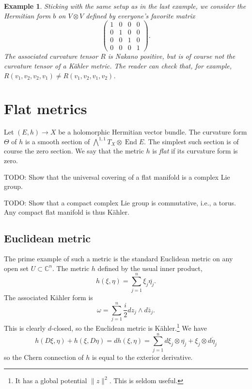 \documentclass[11pt]{article}
\newtheorem{exam}[theo]{Example}
\newcommand{\kk}[1]{\mathbb{#1}}
\DeclareMathOperator{\End}{End}
\begin{document}
\begin{exam}
  Sticking with the same setup as in the last example, we consider the Hermitian form $b$ on $V \otimes V$ defined by everyone's favorite matrix
$$
\begin{pmatrix}
  1 & 0 & 0 & 0 \\
  0 & 1 & 0 & 0 \\
  0 & 0 & 1 & 0 \\
  0 & 0 & 0 & 1
\end{pmatrix}.
$$
The associated curvature tensor $R$ is Nakano positive, but is of course not the curvature tensor of a K\"ahler metric. The reader can check that, for example, $R(v_1,v_2,v_2,v_1) \not= R(v_1,v_2,v_1,v_2)$.
\end{exam}


\section{Flat metrics}
\label{sec:org504b250}

Let $(E,h) \to X$ be a holomorphic Hermitian vector bundle. The curvature form $\Theta$ of $h$ is a smooth section of $\bigwedge^{1,1}T_X \otimes \End E$. The simplest such section is of course the zero section. We say that the metric $h$ is \emph{flat} if its curvature form is zero.


TODO: Show that the universal covering of a flat manifold is a complex Lie group.

TODO: Show that a compact complex Lie group is commutative, i.e., a torus. Any compact flat manifold is thus K\"ahler.


\subsection{Euclidean metric}

The prime example of such a metric is the standard Euclidean metric on any open set $U \subset \kk C^n$. The metric $h$ defined by the usual inner product,
$$
h(\xi, \eta) = \sum_{j=1}^n \xi_j \overline{\eta_j}.
$$
The associated K\"ahler form is
$$
\omega = \sum_{j=1}^n \frac{i}{2} dz_j \wedge d\bar z_j.
$$
This is clearly $d$-closed, so the Euclidean metric is K\"ahler.\footnote{It has a global potential $\|z\|^2$. This is seldom useful.} We have
$$
h(D\xi, \eta) + h(\xi, D\eta)
= d h(\xi, \eta)
= \sum_{j=1}^n d\xi_j \otimes \overline{\eta_j} + \xi_j \otimes \overline{d\eta_j}
$$
so the Chern connection of $h$ is equal to the exterior derivative.

\end{document}

